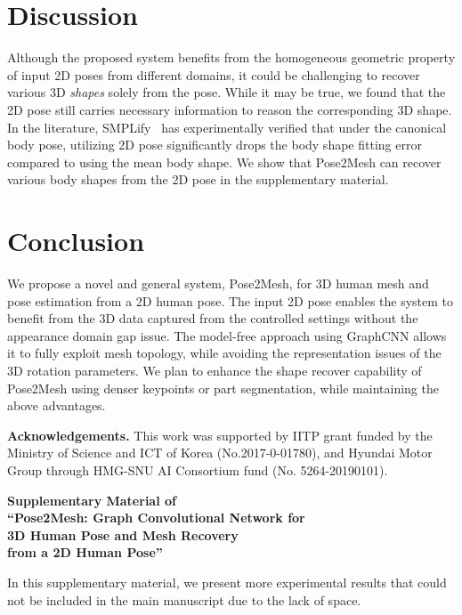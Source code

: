 \documentclass[runningheads]{llncs}
\begin{document}
 \vspace{-2mm}
\section{Discussion}
Although the proposed system benefits from the homogeneous geometric property of input 2D poses from different domains, it could be challenging to recover various 3D \emph{shapes} solely from the pose.
While it may be true, we found that the 2D pose still carries necessary information to reason the corresponding 3D shape.
In the literature, SMPLify~\cite{bogo2016keep} has experimentally verified that under the canonical body pose, utilizing 2D pose significantly drops the body shape fitting error compared to using the mean body shape.
We show that Pose2Mesh can recover various body shapes from the 2D pose in the supplementary material.
 \vspace{-2mm}
\section{Conclusion}
We propose a novel and general system, Pose2Mesh, for 3D human mesh and pose estimation from a 2D human pose. 
The input 2D pose enables the system to benefit from the 3D data captured from the controlled settings without the appearance domain gap issue.
The model-free approach using GraphCNN allows it to fully exploit mesh topology, while avoiding the representation issues of the 3D rotation parameters.
We plan to enhance the shape recover capability of Pose2Mesh using denser keypoints or part segmentation, while maintaining the above advantages.

    
\vspace*{+2mm}

\noindent\textbf{Acknowledgements.} This work was supported by IITP grant funded by the Ministry of Science and ICT of Korea (No.2017-0-01780), and Hyundai Motor Group through HMG-SNU AI Consortium fund (No. 5264-20190101).

\clearpage

\begin{center}
\textbf{\large Supplementary Material of \\ \enquote{Pose2Mesh: Graph Convolutional Network for\\3D Human Pose and Mesh Recovery\\from a 2D Human Pose}}
\end{center}

In this supplementary material, we present more experimental results that could not be included in the main manuscript due to the lack of space.
\end{document}
